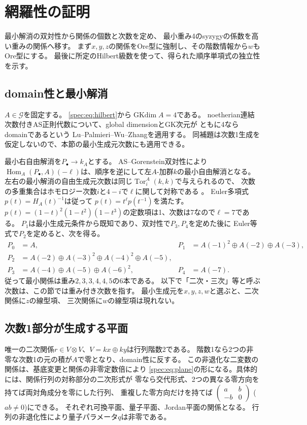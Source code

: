 \documentclass[11pt,a4paper]{ltjsarticle}
\theoremstyle{definition}
\newcommand{\Tor}{\operatorname{Tor}}
\newcommand{\Hom}{\operatorname{Hom}}
\newcommand{\GKdim}{\operatorname{GKdim}}
\newcommand{\Gclass}{\mathcal G}
\begin{document}
\section{網羅性の証明}\label{spec:sec:exhaustion}
最小解消の双対性から関係の個数と次数を定め、
最小重み4のsyzygyの係数を高い重みの関係へ移す。
まず$x,y,z$の関係をOre型に強制し、その階数情報から$w$もOre型にする。
最後に所定のHilbert級数を使って、得られた順序単項式の独立性を示す。

\subsection{domain性と最小解消}
$A\in\Gclass$を固定する。
\eqref{spec:eq:hilbert}から$\GKdim A=4$である。
noetherian連結次数付きAS正則代数について、global dimensionとGK次元が
ともに4ならdomainであるという
Lu--Palmieri--Wu--Zhang\cite[Lemma~1.3]{LPWZ}を適用する。
同補題は次数1生成を仮定しないので、本節の最小生成元次数にも適用できる。

最小右自由解消を$P_\bullet\to k_A$とする。
AS--Gorenstein双対性により
$\Hom_A(P_\bullet,A)(-\ell)$は、順序を逆にして左$A$-加群$k$の最小自由解消となる。
左右の最小解消の自由生成元次数は同じ$\Tor^A_i(k,k)$で与えられるので、
次数の多重集合はホモロジー次数$i$と$4-i$で$\ell$に関して対称である
\cite[Lemma~1.1]{LPWZ}。
Euler多項式$p(t)=H_A(t)^{-1}$は従って
$p(t)=t^\ell p(t^{-1})$を満たす。
$p(t)=(1-t)^2(1-t^2)(1-t^3)$の定数項は1、次数は7なので$\ell=7$である。
$P_1$は最小生成元条件から既知であり、双対性で$P_3,P_4$を定めた後に
Euler等式で$P_2$を定めると、次を得る。
\begin{equation}\label{spec:eq:resolution}
\begin{aligned}
P_0&=A,& P_1&=A(-1)^2\oplus A(-2)\oplus A(-3),\\
P_2&=A(-2)\oplus A(-3)^2\oplus A(-4)^2\oplus A(-5),\\
P_3&=A(-4)\oplus A(-5)\oplus A(-6)^2,& P_4&=A(-7).
\end{aligned}
\end{equation}
従って最小関係は重み$2,3,3,4,4,5$の6本である。
以下で「二次・三次」等と呼ぶ次数は、この節では重み付き次数を指す。
最小生成元を$x,y,z,w$と選ぶと、二次関係に$z$の線型項、
三次関係に$w$の線型項は現れない。

\subsection{次数1部分が生成する平面}
唯一の二次関係$r\in V\otimes V$、$V=kx\oplus ky$は行列階数2である。
階数1なら2つの非零な次数1の元の積が$A$で零となり、domain性に反する。
この非退化な二変数の関係は、基底変更と関係の非零定数倍により
\eqref{spec:eq:plane}の形になる。具体的には、関係行列の対称部分の二次形式が
零なら交代形式、2つの異なる零方向を持てば両対角成分を零にした行列、
重複した零方向だけを持てば
$\left(\begin{smallmatrix}a&b\\-b&0\end{smallmatrix}\right)$
($ab\ne0$)にできる。
それぞれ可換平面、量子平面、Jordan平面の関係となる。
行列の非退化性により量子パラメータ$q$は非零である。
\end{document}
